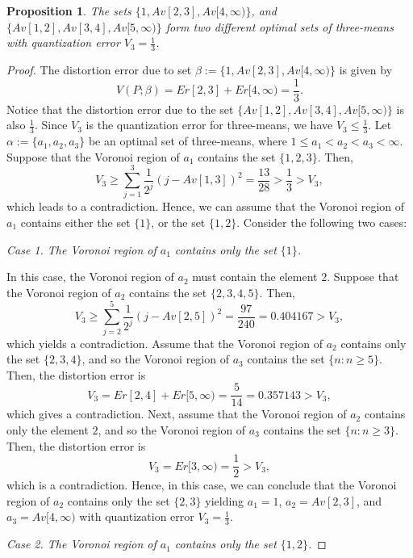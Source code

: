 \documentclass[12pt, reqno]{amsart}
\theoremstyle{plain}
\newtheorem{prop}[subsection]{Proposition}
\theoremstyle{definition}
\newcommand{\set}[1]{\{#1\}}%
\newcommand{\ga}{\alpha}
\newcommand{\gb}{\beta}
\newcommand{\tit}{\textit}%
\begin{document}
\begin{prop} \label{prop111}
The sets $\set{1, Av[2,3], Av[4, \infty)}$, and $\set{Av[1,2], Av[3,4], Av[5, \infty)}$  form two different optimal sets of three-means with quantization error $V_3=\frac{1}{3}$.
\end{prop}
\begin{proof}
The distortion error due to set $\gb:=\set{1, Av[2,3], Av[4, \infty)}$ is given by
\[V(P; \gb)=Er[2,3]+Er[4, \infty)=\frac 13.\]
Notice that the distortion error due to the set $\set{Av[1,2], Av[3,4], Av[5, \infty)}$ is also $\frac 13$.
Since $V_3$ is the quantization error for three-means, we have $V_3\leq \frac 13$. Let $\ga:=\set{a_1, a_2, a_3}$ be an optimal set of three-means, where $1\leq a_1<a_2<a_3<\infty$. Suppose that the Voronoi region of $a_1$ contains the set $\set{1, 2, 3}$.
Then,
\[V_3\geq \sum_{j=1}^3 \frac 1 {2^j}(j-Av[1,3])^2 =\frac{13}{28}>\frac 13>V_3,\]
which leads to a contradiction. Hence, we can assume that the Voronoi region of $a_1$ contains either the set $\set{1}$, or the set $\set{1,2}$. Consider the following two cases:

\tit{Case 1. The Voronoi region of $a_1$ contains only the set $\set{1}$.}

In this case, the Voronoi region of $a_2$ must contain the element $2$. Suppose that the Voronoi region of $a_2$ contains the set $\set{2, 3, 4, 5}$. Then,
\[V_3\geq  \sum_{j=2}^5\frac 1 {2^j}(j-Av[2,5])^2 =\frac{97}{240}=0.404167>V_3,\]
which yields a contradiction. Assume that the Voronoi region of $a_2$ contains only the set $\set{2,3,4}$, and so the Voronoi region of $a_3$ contains the set $\set{n : n\geq 5}$. Then, the distortion error is
\[V_3=Er[2,4]+Er[5, \infty)=\frac 5 {14} =0.357143>V_3,\]
which gives a contradiction.
Next, assume that the Voronoi region of $a_2$ contains only the element $2$, and so the Voronoi region of $a_3$ contains the set $\set{n : n\geq3}$. Then, the distortion error is
\[V_3=Er[3, \infty) =\frac{1}{2}>V_3,\]
which is a contradiction.
Hence, in this case, we can conclude that the Voronoi region of $a_2$ contains only the set $\set{2,3}$ yielding $a_1=1$, $a_2=Av[2,3]$, and $a_3=Av[4, \infty)$ with quantization error $V_3=\frac 13$.

\tit{Case 2. The Voronoi region of $a_1$ contains only the set $\set{1,2}$.}


\end{proof}
\end{document}
